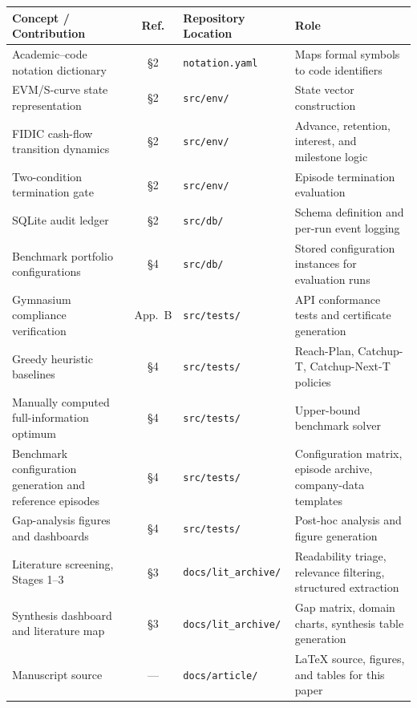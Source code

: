 \documentclass[10pt,border=6pt]{standalone}
\newcommand{\tabfont}{\fontsize{8.5}{10.5}\selectfont}
\newcommand{\code}[1]{\texttt{#1}}
\begin{document}
\begin{minipage}{170mm}
\tabfont
\setlength{\tabcolsep}{4pt}
\renewcommand{\arraystretch}{1.15}
\begin{tabularx}{\linewidth}{
    >{\raggedright\arraybackslash}p{44mm}   %
    c                                        %
    >{\raggedright\arraybackslash}p{42mm}   %
    >{\raggedright\arraybackslash}X          %
}
\toprule
\textbf{Concept / Contribution} &
\textbf{Ref.} &
\textbf{Repository Location} &
\textbf{Role} \\
\midrule
Academic--code notation dictionary
  & \S2 & \code{notation.yaml}
  & Maps formal symbols to code identifiers \\
EVM/S-curve state representation
  & \S2 & \code{src/env/}
  & State vector construction \\
FIDIC cash-flow transition dynamics
  & \S2 & \code{src/env/}
  & Advance, retention, interest, and milestone logic \\
Two-condition termination gate
  & \S2 & \code{src/env/}
  & Episode termination evaluation \\
SQLite audit ledger
  & \S2 & \code{src/db/}
  & Schema definition and per-run event logging \\
Benchmark portfolio configurations
  & \S4 & \code{src/db/}
  & Stored configuration instances for evaluation runs \\
Gymnasium compliance verification
  & App.~B & \code{src/tests/}
  & API conformance tests and certificate generation \\
Greedy heuristic baselines
  & \S4 & \code{src/tests/}
  & Reach-Plan, Catchup-T, Catchup-Next-T policies \\
Manually computed full-information optimum
  & \S4 & \code{src/tests/}
  & Upper-bound benchmark solver \\
Benchmark configuration generation and reference episodes
  & \S4 & \code{src/tests/}
  & Configuration matrix, episode archive, company-data templates \\
Gap-analysis figures and dashboards
  & \S4 & \code{src/tests/}
  & Post-hoc analysis and figure generation \\
Literature screening, Stages 1--3
  & \S3 & \code{docs/lit\_archive/}
  & Readability triage, relevance filtering, structured extraction \\
Synthesis dashboard and literature map
  & \S3 & \code{docs/lit\_archive/}
  & Gap matrix, domain charts, synthesis table generation \\
Manuscript source
  & --- & \code{docs/article/}
  & \LaTeX{} source, figures, and tables for this paper \\
\bottomrule
\end{tabularx}
\end{minipage}
\end{document}
